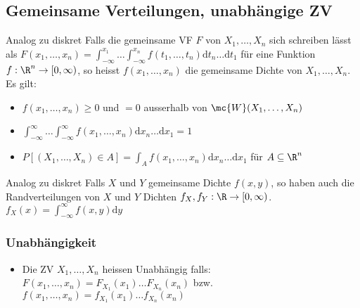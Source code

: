 \subsection{Gemeinsame Verteilungen, unabhängige ZV}
\begin{itemize}
     Analog zu diskret
     Falls die gemeinsame VF $F$ von $X_1, \dots, X_n$ sich schreiben lässt als $F(x_1, \dots, x_n) = \int_{-\infty}^{x_1} \dots \int_{-\infty}^{x_n} f(t_1, \dots, t_n) \mathrm{d}t_n \dots \mathrm{d}t_1$ für eine Funktion $f: \R^n \to [0, \infty)$, so heisst $f(x_1, \dots, x_n)$ die gemeinsame Dichte von $X_1, \dots, X_n$. Es gilt:
        \begin{itemize}
            \item $f(x_1, \dots, x_n) \ge 0$ und $=0$ ausserhalb von $\mc{W}(X_1, \dots, X_n)$
            \item $\int_{-\infty}^{\infty} \dots \int_{-\infty}^{\infty} f(x_1, \dots, x_n) \mathrm{d}x_n \dots \mathrm{d}x_1 = 1$
            \item $P[(X_1, \dots, X_n) \in A] = \int_{A} f(x_1, \dots, x_n) \mathrm{d}x_n \dots \mathrm{d}x_1$ für $A \subseteq \R^n$
        \end{itemize}
     Analog zu diskret
     Falls $X$ und $Y$ gemeinsame Dichte $f(x,y)$, so haben auch die Randverteilungen von $X$ und $Y$ Dichten $f_X, f_Y: \R \to [0, \infty)$. $f_X(x) = \int_{-\infty}^{\infty} f(x, y) \mathrm{d}y$
\end{itemize}

\subsubsection{Unabhängigkeit}
\begin{itemize}
    \item Die ZV $X_1, \dots, X_n$ heissen Unabhängig falls: $F(x_1, \dots, x_n) = F_{X_1}(x_1) \dots F_{X_n}(x_n)$ bzw. $f(x_1, \dots, x_n) = f_{X_1}(x_1) \dots f_{X_n}(x_n)$
\end{itemize}

